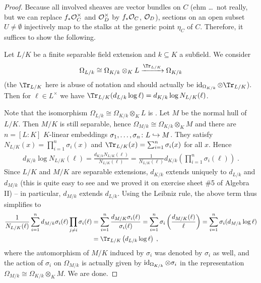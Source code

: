 \documentclass[a4paper,parskip=half,numbers=enddot, DIV=12]{scrreprt}
\begin{document}
\begin{proof}
	Because all involved sheaves are vector bundles on $C$ (ehm \ldots\ not really, but we can replace $f_*\mathcal{O}_C^\times$ and $\mathcal{O}_D^\times$ by $f_*\mathcal{O}_C$, $\mathcal{O}_D$), sections on an open subset $U\neq\emptyset$ injectively map to the stalks at the generic point $\eta_C$ of $C$. Therefore, it suffices to show the following.
	\begin{claim}
		Let $L/K$ be a finite separable field extension and $k\subseteq K$ a subfield. We consider
		\begin{align*}
			\Omega_{L/k}\cong\Omega_{K/k}\otimes_KL\xrightarrow{\Tr_{L/K}}\Omega_{K/k}
		\end{align*}
		(the $\Tr_{L/K}$ here is abuse of notation and should actually be $\id_{\Omega_{K/k}}\otimes \Tr_{L/K}$). Then for $\ell\in L^\times$ we have $\Tr_{L/K}(d_{L/k}\log \ell)=d_{K/k}\log N_{L/K}(\ell)$.
	\end{claim}
	Note that the isomorphism $\Omega_{L/k}\cong \Omega_{K/k}\otimes_KL$ is \cite[Lemma~16.15]{eisenbudCommAlg}. Let $M$ be the normal hull of $L/K$. Then $M/K$ is still separable, hence $\Omega_{M/k}\cong \Omega_{K/k}\otimes_KM$ and there are $n=[L:K]$ $K$-linear embeddings $\sigma_1,\ldots,\sigma_n\colon L\monomorphism M$.  They satisfy $N_{L/K}(x)=\prod_{i=1}^n\sigma_i(x)$ and $\Tr_{L/K}(x)=\sum_{i=1}^n\sigma_i(x)$ for all $x$. Hence
	\begin{align*}
	d_{K/k}\log N_{L/K}(\ell)=\frac{d_{K/k}N_{L/K}(\ell)}{N_{L/K}(\ell)}=\frac{1}{N_{L/K}(\ell)}d_{K/k}\left(\prod_{i=1}^n\sigma_i(\ell)\right)\;.
	\end{align*}
	Since $L/K$ and $M/K$ are separable extensions, $d_{K/k}$ extends uniquely to $d_{L/k}$ and $d_{M/k}$ (this is quite easy to see and we proved it on exercise sheet \#5 of Algebra II)  -- in particular, $d_{M/k}$ extends $d_{L/k}$. Using the Leibniz rule, the above term thus simplifies to
	\begin{align*}
		\frac{1}{N_{L/K}(\ell)}\sum_{i=1}^nd_{M/k}\sigma_i(\ell)\prod_{j\neq i}\sigma_i(\ell)&=\sum_{i=1}^n\frac{d_{M/K}\sigma_i(\ell)}{\sigma_i(\ell)}=\sum_{i=1}^n\sigma_i\left(\frac{d_{M/K}(\ell)}{\ell}\right)=\sum_{i=1}^n\sigma_i(d_{M/k}\log \ell)\\
		&=\Tr_{L/K}\left(d_{L/k}\log\ell\right)\;,
	\end{align*}
	where the automorphism of $M/K$ induced by $\sigma_i$ was denoted by $\sigma_i$ as well, and the action of $\sigma_i$ on $\Omega_{M/k}$ is actually given by $\operatorname{id}_{\Omega_{K/k}}\otimes \sigma_i$ in the representation $\Omega_{M/k}\cong \Omega_{K/k}\otimes_KM$. We are done.
\end{proof}
\end{document}
